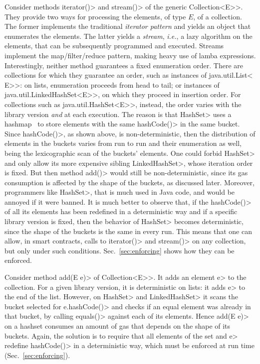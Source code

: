 Consider methods \<iterator()> and \<stream()> of the generic
\<Collection$\text{<}$E$\text{>}$>. They provide two ways for
processing the elements, of type $E$, of a collection. The former implements
the traditional \emph{iterator pattern} and yields an object that enumerates
the elements. The latter yields a \emph{stream}, \emph{i.e.},
a lazy algorithm on the
elements, that can be subsequently programmed and executed.
Streams implement the map/filter/reduce pattern, making
heavy use of lamba expressions.
Interestingly, neither method
guarantees a fixed enumeration order.
There are collections for which they
guarantee an order, such as instances of \<java.util.List$\text{<}$E$\text{>}$>:
on lists, enumeration proceeds from head to tail;
or instances of \<java.util.LinkedHashSet$\text{<}$E$\text{>}$>, on which they proceed in
insertion order.
For collections such as \<java.util.HashSet$\text{<}$E$\text{>}$>, instead, the order
varies with the library version \emph{and} at each execution. The reason is that
\<HashSet> uses a hashmap~\cite{CormenLRS09}
to store elements with the same \<hashCode()> in the same bucket.
Since \<hashCode()>, as shown above, is non-deterministic, then
the distribution of elements in the buckets varies from run to run and their enumeration
as well, being the lexicographic scan of the buckets' elements.
One could forbid \<HashSet> and only allow its
more expensive sibling \<LinkedHashSet>, whose iteration order is fixed.
But then method \<add()> would still be non-deterministic, since its gas consumption
is affected by the shape of the buckets, as discussed later.
Moreover, programmers like \<HashSet>, that is much used
in Java code, and would be annoyed if it were
banned. It is much better to observe that,
if the \<hashCode()> of all its elements has been redefined in a deterministic way
and if a specific library version is fixed, then the behavior of \<HashSet> becomes
deterministic, since the shape of the buckets is the same in every run. This means that one
can allow, in smart contracts, calls to \<iterator()> and \<stream()> on any collection,
but only under such conditions. Sec.~\ref{sec:enforcing} shows how they can be enforced.

Consider method \<add(E e)> of \<Collection$\text{<}$E$\text{>}$>.
It adds an element \<e> to the collection. For a given library version,
it is deterministic on lists: it adds \<e> to the end of the list.
However, on \<HashSet> and \<LinkedHashSet> it scans the bucket selected
for \<e.hashCode()> and checks if an equal element was already in that
bucket, by calling \<equals()> against each of its elements. Hence \<add(E e)>
on a hashset consumes an amount of gas that depends on the shape of its buckets.
Again, the solution is to require that all elements of the set and \<e> redefine
\<hashCode()> in a deterministic way, which must be enforced at run time
(Sec.~\ref{sec:enforcing}).


